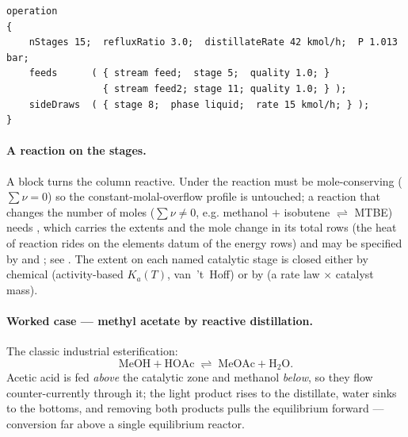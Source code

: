 \documentclass[11pt,a4paper]{article}
\begin{document}
\begin{center}
\end{center}

\begin{lstlisting}[language=dict]
operation
{
    nStages 15;  refluxRatio 3.0;  distillateRate 42 kmol/h;  P 1.013 bar;
    feeds      ( { stream feed;  stage 5;  quality 1.0; }
                 { stream feed2; stage 11; quality 1.0; } );
    sideDraws  ( { stage 8;  phase liquid;  rate 15 kmol/h; } );
}
\end{lstlisting}

\paragraph{A reaction on the stages.}  A  block
turns the column reactive.  Under  the reaction must be
mole-conserving ($\sum \nu = 0$) so the constant-molal-overflow profile is
untouched; a reaction that changes the number of moles ($\sum \nu \neq 0$, e.g.
methanol $+$ isobutene $\rightleftharpoons$ MTBE) needs , which carries the
extents and the mole change in its total rows (the heat of reaction rides on the
elements datum of the energy rows) and may be specified by  and
; see .  The extent on each named catalytic stage is closed either
by chemical  (activity-based $K_a(T)$, van~'t~Hoff)
or by  (a rate law $\times$ catalyst mass).

\paragraph{Worked case --- methyl acetate by reactive distillation.}
The classic industrial esterification:
\[
   \text{MeOH} + \text{HOAc} \;\rightleftharpoons\; \text{MeOAc} + \text{H}_2\text{O}.
\]
Acetic acid is fed \emph{above} the catalytic zone and methanol
\emph{below}, so they flow counter-currently through it; the light
product rises to the distillate, water sinks to the bottoms, and
removing both products pulls the equilibrium forward --- conversion far
above a single equilibrium reactor.
\end{document}
